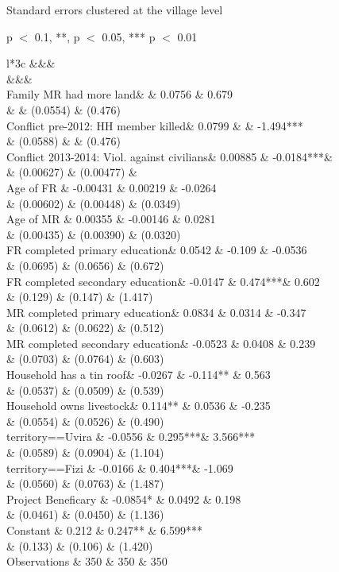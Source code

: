 \documentclass[
]{article}
\begin{document}
Standard errors clustered at the village level

p \(<\) 0.1, **, p \(<\) 0.05, *** p \(<\) 0.01

l*3c \&\&\&\\
\&\&\&\\
Family MR had more land\& \& 0.0756 \& 0.679\\
\& \& (0.0554) \& (0.476)\\
Conflict pre-2012: HH member killed\& 0.0799 \& \& -1.494***\\
\& (0.0588) \& \& (0.476)\\
Conflict 2013-2014: Viol. against civilians\& 0.00885 \& -0.0184***\&\\
\& (0.00627) \& (0.00477) \&\\
Age of FR \& -0.00431 \& 0.00219 \& -0.0264\\
\& (0.00602) \& (0.00448) \& (0.0349)\\
Age of MR \& 0.00355 \& -0.00146 \& 0.0281\\
\& (0.00435) \& (0.00390) \& (0.0320)\\
FR completed primary education\& 0.0542 \& -0.109 \& -0.0536\\
\& (0.0695) \& (0.0656) \& (0.672)\\
FR completed secondary education\& -0.0147 \& 0.474***\& 0.602\\
\& (0.129) \& (0.147) \& (1.417)\\
MR completed primary education\& 0.0834 \& 0.0314 \& -0.347\\
\& (0.0612) \& (0.0622) \& (0.512)\\
MR completed secondary education\& -0.0523 \& 0.0408 \& 0.239\\
\& (0.0703) \& (0.0764) \& (0.603)\\
Household has a tin roof\& -0.0267 \& -0.114** \& 0.563\\
\& (0.0537) \& (0.0509) \& (0.539)\\
Household owns livestock\& 0.114** \& 0.0536 \& -0.235\\
\& (0.0554) \& (0.0526) \& (0.490)\\
territory==Uvira \& -0.0556 \& 0.295***\& 3.566***\\
\& (0.0589) \& (0.0904) \& (1.104)\\
territory==Fizi \& -0.0166 \& 0.404***\& -1.069\\
\& (0.0560) \& (0.0763) \& (1.487)\\
Project Beneficary \& -0.0854* \& 0.0492 \& 0.198\\
\& (0.0461) \& (0.0450) \& (1.136)\\
Constant \& 0.212 \& 0.247** \& 6.599***\\
\& (0.133) \& (0.106) \& (1.420)\\
Observations \& 350 \& 350 \& 350\\
\end{document}
